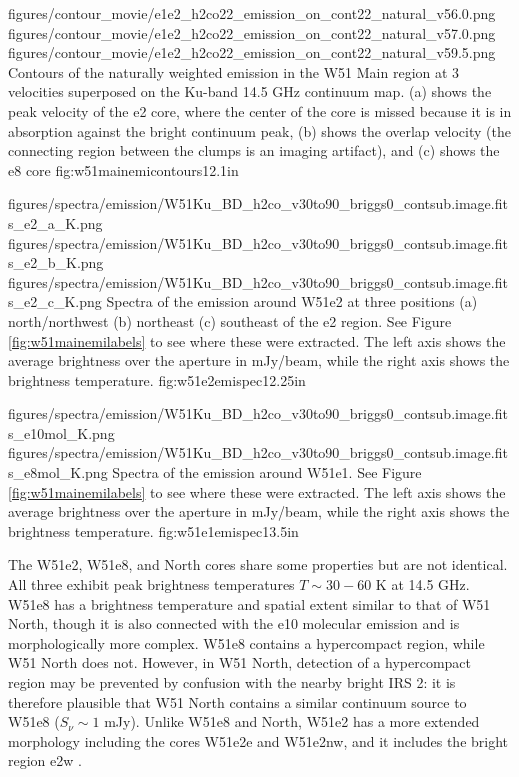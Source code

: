 \FigureThreeAA
{figures/contour_movie/e1e2_h2co22_emission_on_cont22_natural_v56.0.png}
{figures/contour_movie/e1e2_h2co22_emission_on_cont22_natural_v57.0.png}
{figures/contour_movie/e1e2_h2co22_emission_on_cont22_natural_v59.5.png}
{Contours of the \formaldehyde \twotwo naturally weighted emission in the W51
Main region at 3 velocities superposed on the Ku-band 14.5 GHz continuum map.
(a) shows the peak velocity of the e2 core, where the center of the core is
missed because it is
in absorption against the bright continuum peak, (b) shows the overlap
velocity (the connecting region between the clumps is an imaging artifact), and
(c) shows the e8 core}
{fig:w51mainemicontours}{1}{2.1in}

\FigureThreeAA
{figures/spectra/emission/W51Ku_BD_h2co_v30to90_briggs0_contsub.image.fits_e2_a_K.png}
{figures/spectra/emission/W51Ku_BD_h2co_v30to90_briggs0_contsub.image.fits_e2_b_K.png}
{figures/spectra/emission/W51Ku_BD_h2co_v30to90_briggs0_contsub.image.fits_e2_c_K.png}
{Spectra of the \twotwo emission around W51e2 at three positions (a)
north/northwest (b) northeast (c) southeast of the e2 \hchii region.  See Figure
\ref{fig:w51mainemilabels} to see where these were extracted.  The left axis
shows the average brightness over the aperture in mJy/beam, while the right axis
shows the brightness temperature.}
{fig:w51e2emispec}{1}{2.25in}

\FigureTwoAA
{figures/spectra/emission/W51Ku_BD_h2co_v30to90_briggs0_contsub.image.fits_e10mol_K.png}
{figures/spectra/emission/W51Ku_BD_h2co_v30to90_briggs0_contsub.image.fits_e8mol_K.png}
{Spectra of the \twotwo emission around W51e1.  See Figure
\ref{fig:w51mainemilabels} to see where these were extracted.  The left axis
shows the average brightness over the aperture in mJy/beam, while the right axis
shows the brightness temperature.
}
{fig:w51e1emispec}{1}{3.5in}



The W51e2, W51e8, and North cores share some properties but are not identical.
All three exhibit peak \formaldehyde \twotwo brightness temperatures
$T\sim30-60$ K at 14.5 GHz.  W51e8 has a
brightness temperature and spatial extent similar to that of W51 North, though
it is also connected with the e10 molecular emission and is morphologically
more complex.  W51e8 contains a hypercompact \hii region, while W51 North does
not.  However, in W51 North, detection of a hypercompact \hii region may be prevented by
confusion with the nearby bright IRS 2: it is therefore plausible that
W51 North contains a similar continuum source to W51e8 ($S_\nu \sim 1$ mJy).
Unlike W51e8 and North, W51e2 has a more extended morphology including
the cores W51e2e and W51e2nw, and it includes the bright \hchii region e2w
\citep{Shi2010a,Goddi2016a}.

